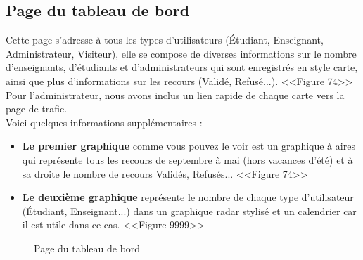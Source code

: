 \documentclass[12pt]{report}
\begin{document}
\newpage

\subsection{Page du tableau de bord}

Cette page s'adresse à tous les types d'utilisateurs (Étudiant, Enseignant, Administrateur, Visiteur), elle se compose de diverses informations sur le nombre d'enseignants, d'étudiants et d'administrateurs qui sont enregistrés en style carte, ainsi que plus d'informations sur les recours (Validé, Refusé...). <<Figure 74>>
\\
Pour l'administrateur, nous avons inclus un lien rapide de chaque carte vers la page de trafic.
\\
Voici quelques informations supplémentaires :

\begin{itemize}
  \item \textbf{Le premier graphique} comme vous pouvez le voir est un graphique à aires qui représente tous les recours de septembre à mai (hors vacances d'été) et à sa droite le nombre de recours Validés, Refusés... <<Figure 74>>
  \item \textbf{Le deuxième graphique} représente le nombre de chaque type d'utilisateur (Étudiant, Enseignant...) dans un graphique radar stylisé et un calendrier car il est utile dans ce cas. <<Figure 9999>>
\end{itemize}

\vspace{0.3in}

\begin{figure}[h]
\centering
\caption{Page du tableau de bord}
\end{figure}
\end{document}
